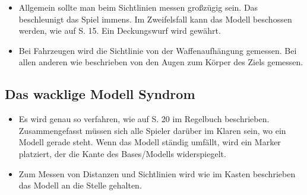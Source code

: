 \begin{itemize}

 \item Allgemein sollte man beim Sichtlinien messen großzügig sein. Das
  beschleunigt das Spiel immens. Im Zweifelsfall kann das Modell beschossen
  werden, wie auf S. 15. Ein Deckungswurf wird gewährt.

\item Bei Fahrzeugen wird die Sichtlinie von der Waffenaufhängung gemessen. Bei
 allen anderen wie beschrieben von den Augen zum Körper des Ziels gemessen.

\end{itemize}

\subsection{Das wacklige Modell Syndrom}

\begin{itemize}

 \item Es wird genau so verfahren, wie auf S. 20 im Regelbuch beschrieben.
  Zusammengefasst müssen sich alle Spieler darüber im Klaren sein, wo ein Modell
  gerade steht.  Wenn das Modell ständig umfällt, wird ein Marker platziert, der
  die Kante des Bases/Modells widerspiegelt.

 \item Zum Messen von Distanzen und Sichtlinien wird wie im Kasten beschrieben
  das Modell an die Stelle gehalten.

\end{itemize}

